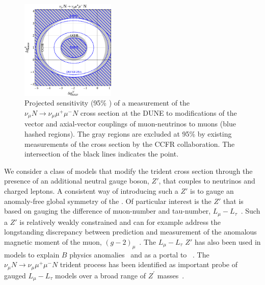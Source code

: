 \begin{figure}[tb!]
\centering
\includegraphics[width=0.4\textwidth]{graphics/model_independent_2.pdf}
\caption[$\nu_\mu N \to \nu_\mu \mu^+\mu^- N$ cross section at ND and (axial-)vector couplings of \numu{} to muons]
{Projected sensitivity (95\% ) of a measurement of the $\nu_\mu N \to \nu_\mu \mu^+\mu^- N$ cross section at the DUNE  to modifications of the vector and axial-vector couplings of muon-neutrinos to muons (blue hashed regions). The gray regions are excluded at 95\%  by existing measurements of the cross section by the CCFR collaboration. The intersection of the black lines indicates the  point.}
\label{fig:trident_gVgA}
\end{figure}

We consider a class of models that modify the trident cross section through the presence of an additional neutral gauge boson, $Z'$, that couples to neutrinos and charged leptons. A consistent way of introducing such a $Z'$ is to gauge an anomaly-free global symmetry of the . Of particular interest is the $Z'$ that is based on gauging the difference of muon-number and tau-number, $L_\mu - L_\tau$~\cite{He:1990pn,He:1991qd}. Such a $Z'$ is relatively weakly constrained and can for example address the longstanding discrepancy between  prediction and measurement of the anomalous magnetic moment of the muon, $(g-2)_\mu$~\cite{Baek:2001kca,Harigaya:2013twa}. The $L_\mu - L_\tau$ $Z'$ has also been used in models to explain $B$ physics anomalies~\cite{Altmannshofer:2014cfa} and as a portal to ~\cite{Baek:2008nz,Altmannshofer:2016jzy}. The $\nu_\mu N \to \nu_\mu \mu^+\mu^- N$ trident process has been identified as important probe of gauged $L_\mu - L_\tau$ models over a broad range of $Z^\prime$ masses~\cite{Altmannshofer:2014cfa,Altmannshofer:2014pba}.

